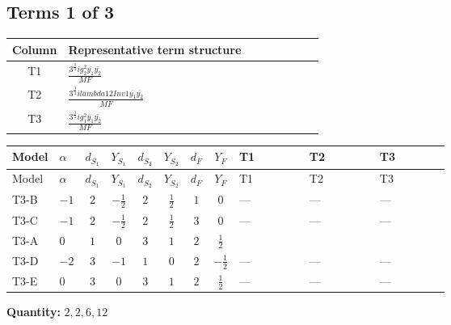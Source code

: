 \documentclass[8pt]{article}
\begin{document}
\begin{landscape}
\subsection*{Terms 1 of 3}
\begin{center}
\begin{tabular}{@{}c >{\raggedright\arraybackslash}p{0.82\linewidth}@{}}
\toprule
Column & Representative term structure \\
\midrule
T1 & \(\displaystyle \frac{3^{\frac{3}{4}} i g_{2}^{2} \overline{y_{1}} \overline{y_{2}}}{MF}\) \\
\midrule
T2 & \(\displaystyle \frac{3^{\frac{3}{4}} i lambda12Inv1 \overline{y_{1}} \overline{y_{2}}}{MF}\) \\
\midrule
T3 & \(\displaystyle \frac{3^{\frac{3}{4}} i g_{1}^{2} \overline{y_{1}} \overline{y_{2}}}{MF}\) \\
\midrule
\bottomrule
\end{tabular}
\end{center}
\smallskip
\tiny
\begin{longtable}{@{}llcccccc >{\raggedright\arraybackslash}p{0.21\linewidth} >{\raggedright\arraybackslash}p{0.21\linewidth} >{\raggedright\arraybackslash}p{0.21\linewidth}@{}}
\toprule
Model & $\alpha$ & $d_{S_1}$ & $Y_{S_1}$ & $d_{S_2}$ & $Y_{S_2}$ & $d_F$ & $Y_F$ & T1 & T2 & T3 \\
\midrule
\endfirsthead
\toprule
Model & $\alpha$ & $d_{S_1}$ & $Y_{S_1}$ & $d_{S_2}$ & $Y_{S_2}$ & $d_F$ & $Y_F$ & T1 & T2 & T3 \\
\midrule
\endhead
T3-B & $-1$ & $2$ & $-\frac{1}{2}$ & $2$ & $\frac{1}{2}$ & $1$ & $0$ & --- & --- & --- \\
\midrule
T3-C & $-1$ & $2$ & $-\frac{1}{2}$ & $2$ & $\frac{1}{2}$ & $3$ & $0$ & --- & --- & --- \\
\midrule
T3-A & $0$ & $1$ & $0$ & $3$ & $1$ & $2$ & $\frac{1}{2}$ & \scriptsize\adjustbox{max width=\linewidth}{$\begin{gathered} - \frac{11 \cdot 3^{\frac{3}{4}} i g_{2}^{2} \overline{y_{1}} \overline{y_{2}}}{8 MF}\end{gathered}$} & \scriptsize\adjustbox{max width=\linewidth}{$\begin{gathered} - \frac{3^{\frac{3}{4}} i lambda12Inv1 \overline{y_{1}} \overline{y_{2}}}{6 MF}\end{gathered}$} & \scriptsize\adjustbox{max width=\linewidth}{$\begin{gathered} - \frac{3^{\frac{3}{4}} i g_{1}^{2} \overline{y_{1}} \overline{y_{2}}}{8 MF}\end{gathered}$} \\
\midrule
T3-D & $-2$ & $3$ & $-1$ & $1$ & $0$ & $2$ & $-\frac{1}{2}$ & --- & --- & --- \\
\midrule
T3-E & $0$ & $3$ & $0$ & $3$ & $1$ & $2$ & $\frac{1}{2}$ & --- & --- & --- \\
\midrule
\bottomrule
\end{longtable}
\clearpage
\noindent\textbf{Quantity: }$\mathrm{2,2,6,12}$\par\smallskip

\end{landscape}
\end{document}
